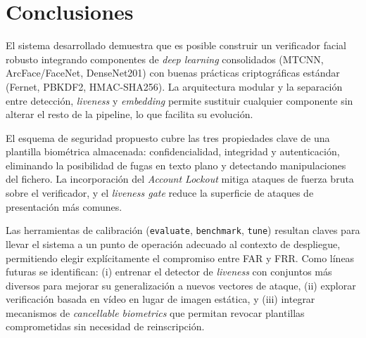\section{Conclusiones}
\label{sec:conclusiones}

El sistema desarrollado demuestra que es posible construir un verificador facial robusto integrando componentes de \textit{deep learning} consolidados (MTCNN, ArcFace/FaceNet, DenseNet201) con buenas prácticas criptográficas estándar (Fernet, PBKDF2, HMAC-SHA256). La arquitectura modular y la separación entre detección, \textit{liveness} y \textit{embedding} permite sustituir cualquier componente sin alterar el resto de la pipeline, lo que facilita su evolución.

El esquema de seguridad propuesto cubre las tres propiedades clave de una plantilla biométrica almacenada: confidencialidad, integridad y autenticación, eliminando la posibilidad de fugas en texto plano y detectando manipulaciones del fichero. La incorporación del \textit{Account Lockout} mitiga ataques de fuerza bruta sobre el verificador, y el \textit{liveness gate} reduce la superficie de ataques de presentación más comunes.

Las herramientas de calibración (\texttt{evaluate}, \texttt{benchmark}, \texttt{tune}) resultan claves para llevar el sistema a un punto de operación adecuado al contexto de despliegue, permitiendo elegir explícitamente el compromiso entre FAR y FRR. Como líneas futuras se identifican: (i) entrenar el detector de \textit{liveness} con conjuntos más diversos para mejorar su generalización a nuevos vectores de ataque, (ii) explorar verificación basada en vídeo en lugar de imagen estática, y (iii) integrar mecanismos de \textit{cancellable biometrics} que permitan revocar plantillas comprometidas sin necesidad de reinscripción.
